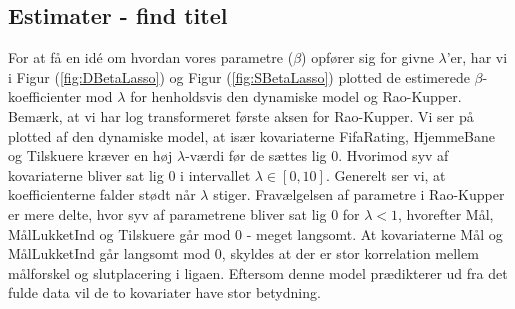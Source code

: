 \documentclass[11pt,a4paper]{article}
\begin{document}
\subsection{Estimater - find titel}
For at få en idé om hvordan vores parametre ($\beta$) opfører sig for givne $\lambda$'er, har vi i Figur (\ref{fig:DBetaLasso}) og Figur (\ref{fig:SBetaLasso}) plotted de estimerede $\beta$-koefficienter mod $\lambda$ for henholdsvis den dynamiske model og Rao-Kupper. Bemærk, at vi har log transformeret første aksen for Rao-Kupper. Vi ser på plotted af den dynamiske model, at især kovariaterne FifaRating, HjemmeBane og Tilskuere kræver en høj $\lambda$-værdi før de sættes lig 0. Hvorimod syv af kovariaterne bliver sat lig 0 i intervallet $\lambda \in [0,10]$. Generelt ser vi, at koefficienterne falder stødt når $\lambda$ stiger. Fravælgelsen af parametre i Rao-Kupper er mere delte, hvor syv af parametrene bliver sat lig 0 for $\lambda<1$, hvorefter Mål, MålLukketInd og Tilskuere går mod 0 - meget langsomt. At kovariaterne Mål og MålLukketInd går langsomt mod 0, skyldes at der er stor korrelation mellem målforskel og slutplacering i ligaen. Eftersom denne model prædikterer ud fra det fulde data vil de to kovariater have stor betydning. 
\\
\end{document}

